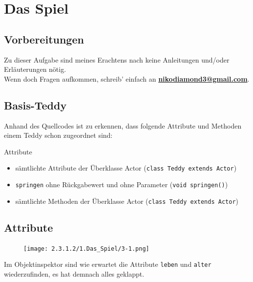\documentclass{scrartcl}   %
\begin{document}
\cleardoublepage

\section{Das Spiel}

\subsection{Vorbereitungen}

Zu dieser Aufgabe sind meines Erachtens nach keine Anleitungen und/oder Erläuterungen nötig.\\
Wenn doch Fragen aufkommen, schreib' einfach an \textbf{\href{mailto:nikodiamond3@gmail.com}{nikodiamond3@gmail.com}}.

\subsection{Basis-Teddy}

Anhand des Quellcodes ist zu erkennen, dass folgende Attribute und Methoden einem Teddy schon zugeordnet sind:

\begin{itemize}
    \barrow Attribute
    \begin{itemize}
    \item sämtlichte Attribute der Überklasse Actor (\texttt{class Teddy extends Actor})
    \end{itemize}
    \begin{itemize}
    \item \texttt{springen} ohne Rückgabewert und ohne Parameter (\texttt{void springen()})
    \item sämtlichte Methoden der Überklasse Actor (\texttt{class Teddy extends Actor})
    \end{itemize}
\end{itemize}

\subsection{Attribute}

\begin{figure}[ht]
	\centering
	\texttt{[image: 2.3.1.2/1.Das\_Spiel/3-1.png]}
\end{figure}

Im Objektinspektor sind wie erwartet die Attribute \texttt{leben} und \texttt{alter} wiederzufinden, es hat demnach alles geklappt.
\end{document}
